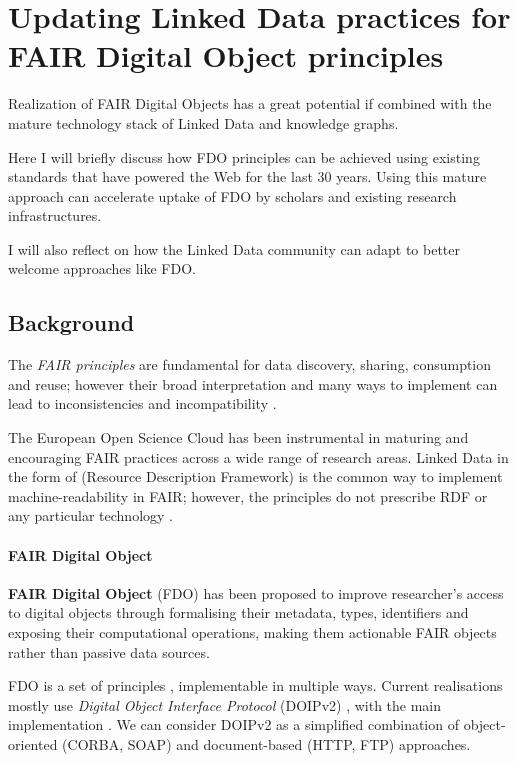 \section{Updating Linked Data practices for FAIR Digital Object principles}
\label{ch2:updating-linked-data-practices-for-fair-digital-object-principles}

Realization of FAIR Digital Objects has a great potential if combined with the mature technology stack of Linked Data and knowledge graphs.

Here I will briefly discuss how FDO principles can be achieved using existing standards that have powered the Web for the last 30 years. Using this mature approach can accelerate uptake of FDO by scholars and existing research infrastructures.

I will also reflect on how the Linked Data community can adapt to better welcome approaches like FDO.

\subsection{Background}
\label{ch2:background}

The \emph{FAIR principles} \cite{Wilkinson 2016} are
fundamental for data discovery, sharing, consumption and reuse; however
their broad interpretation and many ways to implement can lead to
inconsistencies and incompatibility
\cite{Jacobsen 2020}.

The European Open Science Cloud  has
been instrumental in maturing and encouraging FAIR practices across a
wide range of research areas. Linked Data in the form of
 (Resource Description
Framework) is the common way to implement machine-readability in FAIR;
however, the principles do not prescribe RDF or any particular technology
\cite{Mons 2017}.

\paragraph{FAIR Digital Object}
\label{ch2:fair-digital-object}

\textbf{FAIR Digital Object} (FDO)
\cite{Schultes 2019}
has been proposed to improve researcher's access to digital objects
through formalising their metadata, types, identifiers and exposing
their computational operations, making them actionable FAIR objects
rather than passive data sources.

FDO is a set of principles \cite{bonino2019}, implementable in multiple ways. Current realisations mostly
use \emph{Digital Object Interface Protocol} (DOIPv2)
\cite{DONA 2018}, with the
main implementation
. We
can consider DOIPv2 as a simplified combination of object-oriented
(CORBA, SOAP) and document-based (HTTP, FTP) approaches.

